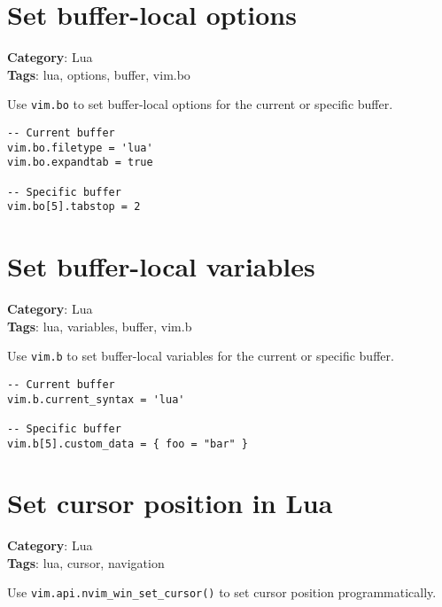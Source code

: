 {{{{{{{\section{Set buffer-local options}

\textbf{Category}: Lua\\ \textbf{Tags}: lua, options, buffer, vim.bo
\vspace{0.5cm}

Use {\footnotesize \Verb§vim.bo§} to set buffer-local options for the current or specific buffer.

\begin{Exa*}{}
\begin{Verbatim}[fontsize=\footnotesize, breaklines, breakanywhere]
-- Current buffer
vim.bo.filetype = 'lua'
vim.bo.expandtab = true

-- Specific buffer
vim.bo[5].tabstop = 2
\end{Verbatim}
\end{Exa*}

\section{Set buffer-local variables}

\textbf{Category}: Lua\\ \textbf{Tags}: lua, variables, buffer, vim.b
\vspace{0.5cm}

Use {\footnotesize \Verb§vim.b§} to set buffer-local variables for the current or specific buffer.

\begin{Exa*}{}
\begin{Verbatim}[fontsize=\footnotesize, breaklines, breakanywhere]
-- Current buffer
vim.b.current_syntax = 'lua'

-- Specific buffer
vim.b[5].custom_data = { foo = "bar" }
\end{Verbatim}
\end{Exa*}

\section{Set cursor position in Lua}

\textbf{Category}: Lua\\ \textbf{Tags}: lua, cursor, navigation
\vspace{0.5cm}

Use {\footnotesize \Verb§vim.api.nvim_win_set_cursor()§} to set cursor position programmatically.

}}}}}}}
